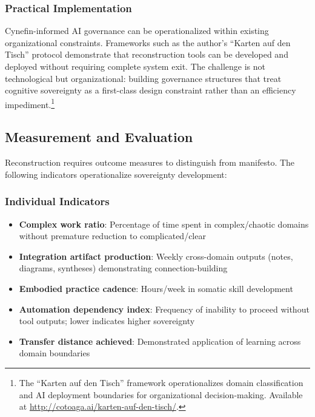 \subsubsection{Practical Implementation}

Cynefin-informed AI governance can be operationalized within existing organizational constraints. Frameworks such as the author's ``Karten auf den Tisch'' protocol \citep{cotoaga2024karten} demonstrate that reconstruction tools can be developed and deployed without requiring complete system exit. The challenge is not technological but organizational: building governance structures that treat cognitive sovereignty as a first-class design constraint rather than an efficiency impediment.\footnote{The ``Karten auf den Tisch'' framework operationalizes domain classification and AI deployment boundaries for organizational decision-making. Available at \url{http://cotoaga.ai/karten-auf-den-tisch/}.}

\subsection{Measurement and Evaluation}
\label{sec:measurement}

Reconstruction requires outcome measures to distinguish from manifesto. The following indicators operationalize sovereignty development:

\subsubsection{Individual Indicators}

\begin{itemize}
\item \textbf{Complex work ratio}: Percentage of time spent in complex/chaotic domains without premature reduction to complicated/clear
\item \textbf{Integration artifact production}: Weekly cross-domain outputs (notes, diagrams, syntheses) demonstrating connection-building
\item \textbf{Embodied practice cadence}: Hours/week in somatic skill development
\item \textbf{Automation dependency index}: Frequency of inability to proceed without tool outputs; lower indicates higher sovereignty
\item \textbf{Transfer distance achieved}: Demonstrated application of learning across domain boundaries
\end{itemize}

